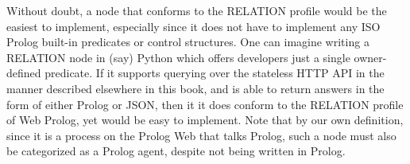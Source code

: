 Without doubt, a node that conforms to the RELATION profile would be the easiest to implement, especially since it does not have to implement any ISO Prolog built-in predicates or control structures. One can imagine writing a RELATION node in (say) Python which offers developers just a single owner-defined predicate. If it supports querying over the stateless HTTP API  in the manner described elsewhere in this book, and is able to return answers in the form of either Prolog or JSON, then it it does conform to the RELATION profile of Web Prolog, yet would be easy to implement. Note that by our own definition, since it is a process on the Prolog Web that talks Prolog, such a node must also be categorized as a Prolog agent, despite not being written in Prolog.
